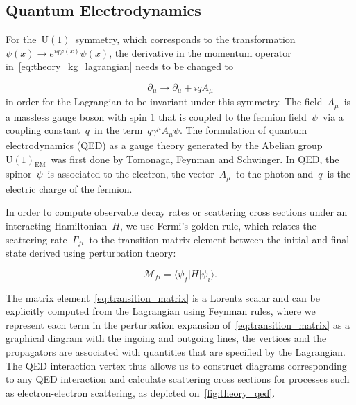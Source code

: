 \subsection{Quantum Electrodynamics}
For the~$\mathrm{U}(1)$~symmetry, which corresponds to the transformation~$\psi(x) \rightarrow e^{i q\varphi(x)} \psi(x)$, the derivative in the momentum operator in~\cref{eq:theory_kg_lagrangian} needs to be changed to

\begin{equation}
\partial_{\mu} \rightarrow \partial_{\mu} + i q A_{\mu}
\end{equation}
in order for the Lagrangian to be invariant under this symmetry. The field~$A_{\mu}$~is a massless gauge boson with spin 1 that is coupled to the fermion field~$\psi$~via a coupling constant~$q$~in the term~$q \gamma^\mu A_\mu \psi$. The formulation of quantum electrodynamics (QED) as a gauge theory generated by the Abelian group~$\mathrm{U}(1)_{\mathrm{EM}}$~was first done by Tomonaga, Feynman and Schwinger. In QED, the spinor~$\psi$~is associated to the electron, the vector~$A_\mu$~to the photon and~$q$~is the electric charge of the fermion. 

In order to compute observable decay rates or scattering cross sections under an interacting Hamiltonian~$H$, we use Fermi's golden rule, which relates the scattering rate~$\Gamma_{fi}$~to the transition matrix element between the initial and final state derived using perturbation theory:

\begin{equation}
\label{eq:transition_matrix}
\mathcal{M}_{fi} = \langle \psi_f | H | \psi_i \rangle.
\end{equation}

The matrix element~\cref{eq:transition_matrix} is a Lorentz scalar and can be explicitly computed from the Lagrangian using Feynman rules, where we represent each term in the perturbation expansion of~\cref{eq:transition_matrix} as a graphical diagram with the ingoing and outgoing lines, the vertices and the propagators are associated with quantities that are specified by the Lagrangian. The QED interaction vertex thus allows us to construct diagrams corresponding to any QED interaction and calculate scattering cross sections for processes such as electron-electron scattering, as depicted on~\cref{fig:theory_qed}.

